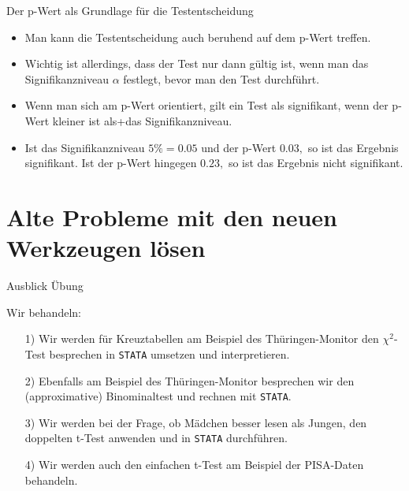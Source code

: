 \documentclass[usenames,dvipsnames,handout]{beamer}
\begin{document}
\begin{frame}{Der p-Wert als Grundlage für die Testentscheidung }%
\begin{itemize}
\item{Man kann die Testentscheidung auch beruhend auf dem p-Wert treffen.}\pause
\item{Wichtig ist allerdings, dass der Test nur dann gültig ist, wenn man das Signifikanzniveau 
$\alpha$ festlegt, bevor man den Test durchführt.}\pause
\item{Wenn man sich am p-Wert orientiert, gilt ein Test als signifikant, wenn der p-Wert kleiner ist als+das Signifikanzniveau. }\pause
\item{Ist das Signifikanzniveau $5\%=0.05$ und der p-Wert $0.03,$ so ist das Ergebnis signifikant. 
Ist der p-Wert hingegen $0.23,$ so ist das Ergebnis nicht signifikant.}
\end{itemize}
\end{frame}

\section{ Alte Probleme mit den neuen Werkzeugen lösen}%

\begin{frame}{Ausblick Übung}

Wir behandeln:
\begin{itemize}
\item[1)]{Wir werden für  Kreuztabellen am Beispiel des Thüringen-Monitor den $\chi^{2}$-Test besprechen in 
\texttt{STATA} umsetzen und  interpretieren.}
\item[2)]{Ebenfalls am Beispiel des Thüringen-Monitor besprechen wir den (approximative) Binominaltest
und rechnen mit \texttt{STATA}.} %
\item[3)]{Wir werden bei der Frage, ob Mädchen besser lesen als Jungen, den doppelten t-Test anwenden
und in \texttt{STATA} durchführen.}
\item[4)]{Wir werden auch den einfachen t-Test am Beispiel der PISA-Daten behandeln.} %
\end{itemize}
\end{frame}

\end{document}
